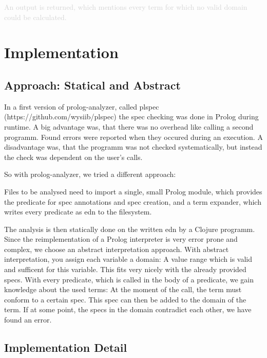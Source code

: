 \documentclass[a4paper]{article}
\begin{document}
\textcolor{lightgray}{An output is returned, which mentions every term for which
no valid domain could be calculated. }

\section{Implementation}
\subsection{Approach: Statical and Abstract}
In a first version of prolog-analyzer, called plspec
(https://github.com/wysiib/plspec) the spec checking was done in Prolog during
runtime. A big advantage was, that there was no overhead like calling a second
programm. Found errors were reported when they occured during an execution. A
disadvantage was, that the programm was not checked systematically, but instead
the check was dependent on the user's calls.



So with prolog-analyzer, we tried a different approach:

Files to be analysed need to import a single, small Prolog module, which
provides the predicate for spec annotations and spec creation, and a term
expander, which writes every predicate as edn to the filesystem.


The analysis is then statically done on the written edn by a Clojure programm.
Since the reimplementation of a Prolog interpreter is very error prone and
complex, we choose an abstract interpretation approach. With abstract
interpretation, you assign each variable a domain: A value range which is valid
and sufficent for this variable. This fits very nicely with the already provided
specs.
With every predicate, which is called in the body of a predicate, we gain
knowledge about the used terms: At the moment of the call, the term must
conform to a certain spec. This spec can then be added to the domain of the
term. If at some point, the specs in the domain contradict each other, we have
found an error.

\subsection{Implementation Detail}
\end{document}
